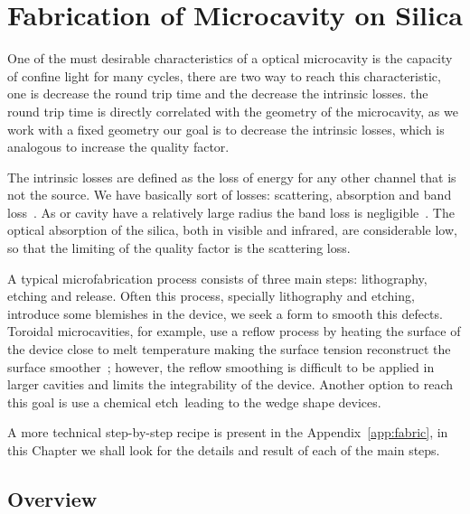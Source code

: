 \chapter{Fabrication of Microcavity on Silica}
\label{chap:fabrication}
One of the must desirable characteristics of a optical microcavity is the capacity of confine light for many cycles, there are two way to reach this characteristic, one is decrease the round trip time and the decrease the intrinsic losses. the round trip time is directly correlated with the geometry of the microcavity, as we work with a fixed geometry our goal is to decrease the intrinsic losses, which is analogous to increase the quality factor. 

The intrinsic losses are defined as the loss of energy for any other channel that is not the source. We have basically sort of losses: scattering, absorption and band loss~\needcit. As or cavity have a relatively large radius the band loss is negligible~\needcit. The optical absorption of the silica, both in visible and infrared, are considerable low, so that the limiting of the quality factor is the scattering loss. 

A typical microfabrication process consists of three main steps: lithography, etching and release. Often this process, specially lithography and etching, introduce some blemishes in the device, we seek a form to smooth this defects.
Toroidal microcavities, for example, use a reflow process by heating the surface of the device close to melt temperature making the surface tension reconstruct the surface smoother~\needcit; however, the reflow smoothing is difficult to be applied in larger cavities and limits the integrability of the device. Another option to reach this goal is use a chemical etch~\needcit leading to the wedge shape devices. 

A more technical step-by-step recipe is present in the Appendix~\ref{app:fabric}, in this Chapter we shall look for the details and result of each of the main steps.

\section{Overview}

